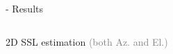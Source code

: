 \begin{frame}{\mirage - Results}
\begin{columns}[T,onlytextwidth]
\begin{column}{.58\textwidth}
        \end{column}
    \end{columns}

    \vspace{5mm}
    \begin{columns}[T,onlytextwidth]
        \begin{column}{.25\textwidth}
            \begin{block}{2D SSL estimation}
                \textcolor{gray}{\small (both Az. and El.)}
            \end{block}
        \end{column}


\end{columns}
\end{frame}

